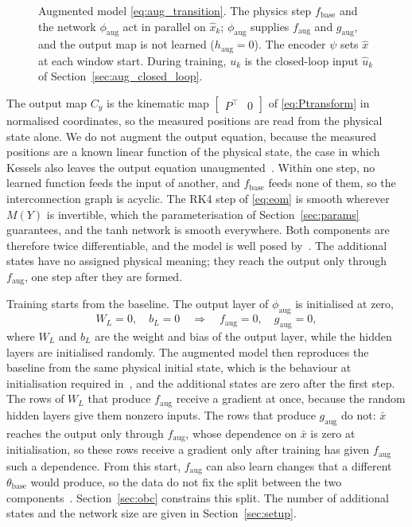 \begin{figure}[t]
 \centering
 \resizebox{\columnwidth}{!}{}
 \caption{Augmented model \eqref{eq:aug_transition}. The physics step
 $f_{\mathrm{base}}$ and the network $\phi_{\mathrm{aug}}$ act in parallel on
 $\hat x_k$; $\phi_{\mathrm{aug}}$ supplies $f_{\mathrm{aug}}$ and
 $g_{\mathrm{aug}}$, and the output map is not learned
 ($h_{\mathrm{aug}}=0$). The encoder $\psi$ sets $\hat x$ at each window
 start. During training, $u_k$ is the closed-loop input $\hat u_k$ of
 Section~\ref{sec:aug_closed_loop}.}
 \label{fig:aug_structure}
\end{figure}

The output map $C_y$ is the kinematic map
$\begin{bmatrix}P^\top & 0\end{bmatrix}$ of \eqref{eq:Ptransform} in
normalised coordinates, so the measured positions are read from the physical
state alone.
We do not augment the output equation, because the measured positions are a
known linear function of the physical state, the case in which Kessels also
leaves the output equation unaugmented~\cite[Remark~5.3]{kessels2025ai}.
Within one step, no learned function feeds the input of another, and
$f_{\mathrm{base}}$ feeds none of them, so the interconnection graph is
acyclic.
The RK4 step of \eqref{eq:eom} is smooth wherever $M(Y)$ is invertible, which
the parameterisation of Section~\ref{sec:params} guarantees, and the tanh
network is smooth everywhere.
Both components are therefore twice differentiable, and the model is well
posed by~\cite[Thm.~9]{hoekstra2026lfr}.
The additional states have no assigned physical meaning; they reach the
output only through $f_{\mathrm{aug}}$, one step after they are formed.

Training starts from the baseline.
The output layer of $\phi_{\mathrm{aug}}$ is initialised at zero,
\begin{equation}
 W_L=0,\quad b_L=0
 \quad\Longrightarrow\quad
 f_{\mathrm{aug}}=0,\quad g_{\mathrm{aug}}=0 ,
 \label{eq:aug_zero_init}
\end{equation}
where $W_L$ and $b_L$ are the weight and bias of the output layer, while the
hidden layers are initialised randomly.
The augmented model then reproduces the baseline from the same physical
initial state, which is the behaviour at initialisation required
in~\cite[Eq.~(29)]{hoekstra2026lfr}, and the additional states are zero
after the first step.
The rows of $W_L$ that produce $f_{\mathrm{aug}}$ receive a gradient at once,
because the random hidden layers give them nonzero inputs.
The rows that produce $g_{\mathrm{aug}}$ do not: $\bar x$ reaches the output
only through $f_{\mathrm{aug}}$, whose dependence on $\bar x$ is zero at
initialisation, so these rows receive a gradient only after training has
given $f_{\mathrm{aug}}$ such a dependence.
From this start, $f_{\mathrm{aug}}$ can also learn changes that a different
$\theta_{\mathrm{base}}$ would produce, so the data do not fix the split
between the two components~\cite[Sec.~5.2]{hoekstra2026lfr}.
Section~\ref{sec:obc} constrains this split.
The number of additional states and the network size are given in
Section~\ref{sec:setup}.

